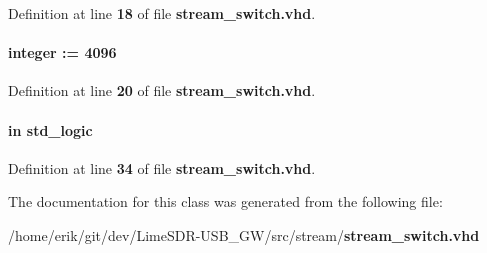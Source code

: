 Definition at line {\bf 18} of file {\bf stream\+\_\+switch.\+vhd}.

\paragraph[{wfm\+\_\+limit}]{ {\bfseries \textcolor{vhdlchar}{ }} {\bfseries \textcolor{comment}{integer}\textcolor{vhdlchar}{ }\textcolor{vhdlchar}{ }\textcolor{vhdlchar}{\+:}\textcolor{vhdlchar}{=}\textcolor{vhdlchar}{ }\textcolor{vhdlchar}{ } \textcolor{vhdldigit}{4096} \textcolor{vhdlchar}{ }} \hspace{0.3cm}{\ttfamily [Generic]}}\label{classstream__switch_a7763a28180c7aa5913a189b63f0719c3}


Definition at line {\bf 20} of file {\bf stream\+\_\+switch.\+vhd}.

\paragraph[{wfm\+\_\+rdy}]{ {\bfseries \textcolor{keywordflow}{in}\textcolor{vhdlchar}{ }} {\bfseries \textcolor{comment}{std\+\_\+logic}\textcolor{vhdlchar}{ }} \hspace{0.3cm}{\ttfamily [Port]}}\label{classstream__switch_af7a8409146762b50f7a601699122fe07}


Definition at line {\bf 34} of file {\bf stream\+\_\+switch.\+vhd}.



The documentation for this class was generated from the following file\+:\begin{DoxyCompactItemize}
\item 
/home/erik/git/dev/\+Lime\+S\+D\+R-\/\+U\+S\+B\+\_\+\+G\+W/src/stream/{\bf stream\+\_\+switch.\+vhd}\end{DoxyCompactItemize}
